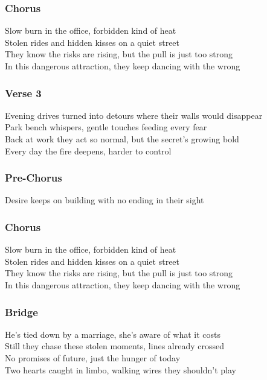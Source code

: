 \subsubsection{Chorus}\label{chorus-83}

Slow burn in the office, forbidden kind of heat\\
Stolen rides and hidden kisses on a quiet street\\
They know the risks are rising, but the pull is just too strong\\
In this dangerous attraction, they keep dancing with the wrong

\subsubsection{Verse 3}\label{verse-3-19}

Evening drives turned into detours where their walls would disappear\\
Park bench whispers, gentle touches feeding every fear\\
Back at work they act so normal, but the secret's growing bold\\
Every day the fire deepens, harder to control

\subsubsection{Pre-Chorus}\label{pre-chorus-65}

Desire keeps on building with no ending in their sight

\subsubsection{Chorus}\label{chorus-84}

Slow burn in the office, forbidden kind of heat\\
Stolen rides and hidden kisses on a quiet street\\
They know the risks are rising, but the pull is just too strong\\
In this dangerous attraction, they keep dancing with the wrong

\subsubsection{Bridge}\label{bridge-31}

He's tied down by a marriage, she's aware of what it costs\\
Still they chase these stolen moments, lines already crossed\\
No promises of future, just the hunger of today\\
Two hearts caught in limbo, walking wires they shouldn't play

